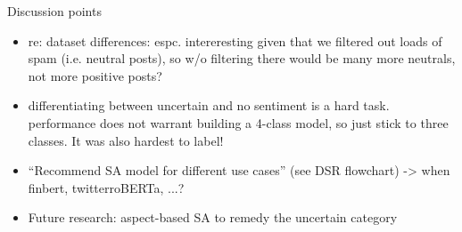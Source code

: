 \newpage
Discussion points
\begin{itemize}[noitemsep]
	\item re: dataset differences: espc. intereresting given that we filtered out loads of spam (i.e. neutral posts), so w/o filtering there would be many more neutrals, not more positive posts?
	\item differentiating between uncertain and no sentiment is a hard task. performance does not warrant building a 4-class model, so just stick to three classes. It was also hardest to label!
	\item ``Recommend SA model for different use cases'' (see DSR flowchart) -> when finbert, twitterroBERTa, ...?
	\item Future research: aspect-based SA to remedy the uncertain category
\end{itemize}